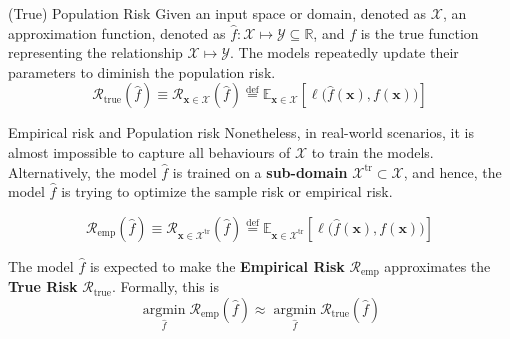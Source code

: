 \begin{frame}{(True) Population Risk \cite{tamang2025handlingoutofdistributiondatasurvey}}
    Given an input space or domain, denoted as $\mathcal X$, an approximation function, denoted as $\hat f: \mathcal X \mapsto \mathcal Y \subseteq \mathbb R$,
    and $f$ is the true function representing the relationship $\mathcal X \mapsto \mathcal Y$.
    The models repeatedly update their parameters to \cite{gulrajani2020searchlostdomaingeneralization} diminish the population risk.
    \label{def1}
    \[
    \mathcal R_{\mathrm{true}}\left(\hat f\right) \equiv \mathcal{R}_{\mathbf x \in \mathcal X}\left(\hat f\right)
    \stackrel{\mathrm{def}}{=} \mathbb E_{\mathbf x \in \mathcal X}\!\left[\ell\big(\hat f(\mathbf x), f(\mathbf x)\big)\right]
    \]
\end{frame}


\begin{frame}{Empirical risk and Population risk \cite{tamang2025handlingoutofdistributiondatasurvey}}
    Nonetheless, in real-world scenarios, it is almost impossible to capture all behaviours of $\mathcal X$ to train the models.
    Alternatively, the model $\hat f$ is trained on a \textbf{sub-domain} $\mathcal X^{\text{tr}} \subset \mathcal X$, and hence, the model $\hat f$ is trying to optimize the sample risk or empirical risk.
    \medskip

    \noindent
    \label{def2}
    \[
    \mathcal R_{\mathrm{emp}}\left(\hat f\right) \equiv \mathcal{R}_{\mathbf x \in \mathcal X^{\text{tr}}}\left(\hat f\right)
    \stackrel{\mathrm{def}}{=} \mathbb E_{\mathbf x \in \mathcal X^{\text{tr}}}\!\left[\ell\big(\hat f(\mathbf x), f(\mathbf x)\big)\right]
    \]

    The model $\hat f$ is expected to \cite{tamang2025handlingoutofdistributiondatasurvey} make the \textbf{Empirical Risk} $\mathcal R_{\text{emp}}$ approximates the \textbf{True Risk} $\mathcal R_{\text{true}}$. Formally, this is
    \[
    \mathop{\arg\min}\limits_{\hat f} \mathcal R_{\text{emp}}\left(\hat f\right) \approx \mathop{\arg\min}\limits_{\hat f} \mathcal R_{\text{true}}\left(\hat f\right)
    \]
\end{frame}